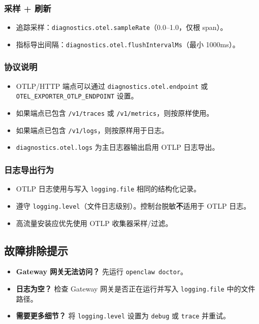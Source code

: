 \subsubsection{采样 + 刷新}


\begin{itemize}
  \item 追踪采样：\texttt{diagnostics.otel.sampleRate}（0.0–1.0，仅根 span）。
  \item 指标导出间隔：\texttt{diagnostics.otel.flushIntervalMs}（最小 1000ms）。
\end{itemize}


\subsubsection{协议说明}


\begin{itemize}
  \item OTLP/HTTP 端点可以通过 \texttt{diagnostics.otel.endpoint} 或 \texttt{OTEL\_EXPORTER\_OTLP\_ENDPOINT} 设置。
  \item 如果端点已包含 \texttt{/v1/traces} 或 \texttt{/v1/metrics}，则按原样使用。
  \item 如果端点已包含 \texttt{/v1/logs}，则按原样用于日志。
  \item \texttt{diagnostics.otel.logs} 为主日志器输出启用 OTLP 日志导出。
\end{itemize}


\subsubsection{日志导出行为}


\begin{itemize}
  \item OTLP 日志使用与写入 \texttt{logging.file} 相同的结构化记录。
  \item 遵守 \texttt{logging.level}（文件日志级别）。控制台脱敏\textbf{不}适用于 OTLP 日志。
  \item 高流量安装应优先使用 OTLP 收集器采样/过滤。
\end{itemize}


\subsection{故障排除提示}


\begin{itemize}
  \item \textbf{Gateway 网关无法访问？} 先运行 \texttt{openclaw doctor}。
  \item \textbf{日志为空？} 检查 Gateway 网关是否正在运行并写入 \texttt{logging.file} 中的文件路径。
  \item \textbf{需要更多细节？} 将 \texttt{logging.level} 设置为 \texttt{debug} 或 \texttt{trace} 并重试。
\end{itemize}




